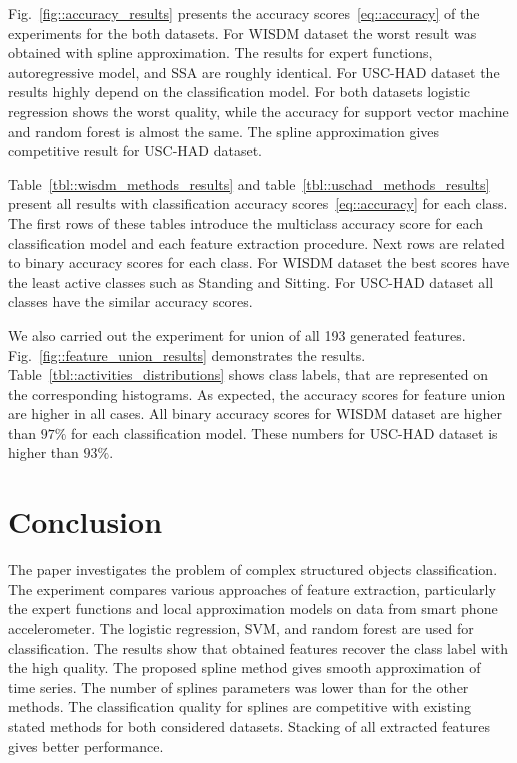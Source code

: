 \documentclass[a4paper,12pt]{article}
\begin{document}
Fig.~\ref{fig::accuracy_results} presents the accuracy scores~\eqref{eq::accuracy} of the experiments for the both datasets. For WISDM dataset the worst result was obtained with spline approximation. 
The results for expert functions, autoregressive model, and SSA are roughly identical. For USC-HAD dataset the results highly depend on the classification model. 
For both datasets logistic regression shows the worst quality, while the accuracy for support vector machine and random forest is almost the same. The spline approximation gives competitive result for USC-HAD dataset.

Table~\ref{tbl::wisdm_methods_results} and table~\ref{tbl::uschad_methods_results} present all results with classification accuracy scores~\eqref{eq::accuracy} for each class. The first rows of these tables introduce the multiclass accuracy score for each classification model and each feature extraction procedure. Next rows are related to binary accuracy scores for each class. For WISDM dataset the best scores have the least active classes such as Standing and Sitting. For USC-HAD dataset all classes have the similar accuracy scores.

We also carried out the experiment for union of all 193 generated features. Fig.~\ref{fig::feature_union_results} demonstrates the results. Table~\ref{tbl::activities_distributions} shows class labels, that are represented on the corresponding histograms. As expected, the accuracy scores for feature union are higher in all cases. All binary accuracy scores for WISDM dataset are higher than $97 \%$ for each classification model. These numbers for USC-HAD dataset is higher than $93 \%$.

\section{Conclusion}

The paper investigates the problem of complex structured objects classification.
The experiment compares various approaches of feature extraction, particularly the expert functions and local approximation models on data from smart phone accelerometer.
The logistic regression, SVM, and random forest are used for classification. 
The results show that obtained features recover the class label with the high quality. 
The proposed spline method gives smooth approximation of time series. 
The number of splines parameters was lower than for the other methods. 
The classification quality for splines are competitive with existing stated methods for both considered datasets.  
Stacking of all extracted features gives better performance.
\end{document}
